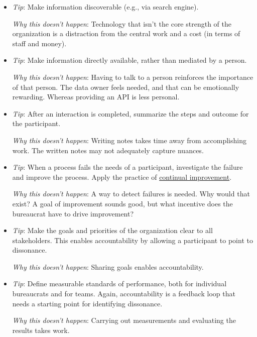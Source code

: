 \begin{itemize}
    \item \textit{Tip}: Make information discoverable (e.g., via search engine).

    \textit{Why this doesn't happen}: Technology that isn't the core strength of the organization is a distraction from the central work and a cost (in terms of staff and money).
    
    \item \textit{Tip}: Make information directly available, rather than mediated by a person. 

    \textit{Why this doesn't happen}: Having to talk to a person reinforces the importance of that person. The data owner feels needed, and that can be emotionally rewarding. Whereas providing an API is less personal. 
    
    \item \textit{Tip}: After an interaction is completed, summarize the steps and outcome for the participant. 

    \textit{Why this doesn't happen}: Writing notes takes time away from accomplishing work. The written notes may not adequately capture nuances.
    
    \item \textit{Tip}: When a process fails the needs of a participant, investigate the failure and improve the process. Apply the practice of \href{https://en.wikipedia.org/wiki/Continual_improvement_process}{continual improvement}.    

    \textit{Why this doesn't happen}: A way to detect failures is needed. Why would that exist? A goal of improvement sounds good, but what incentive does the bureaucrat have to drive improvement?
    
    \item \textit{Tip}: Make the goals and priorities of the organization clear to all stakeholders. This enables accountability by allowing a participant to point to dissonance.  

    \textit{Why this doesn't happen}: Sharing goals enables accountability. 
    
    \item \textit{Tip}: Define measurable standards of performance, both for individual bureaucrats and for teams. Again, accountability is a feedback loop that needs a starting point for identifying dissonance.

    \textit{Why this doesn't happen}: Carrying out measurements and evaluating the results takes work. 
    

\end{itemize}
